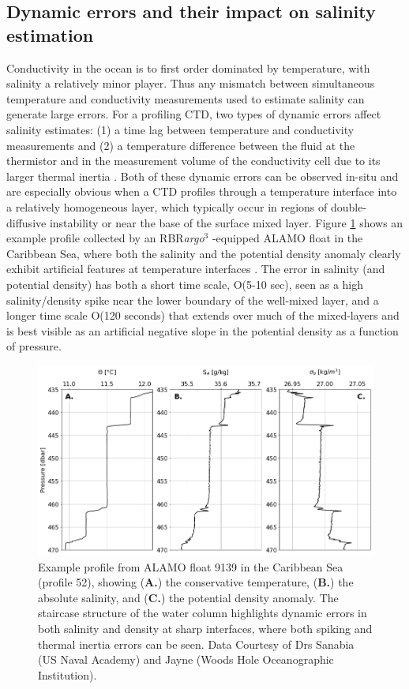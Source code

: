 \documentclass{ametsocV6.1}
\begin{document}
\subsection{Dynamic errors and their impact on salinity estimation}
Conductivity in the ocean is to first order dominated by temperature, with salinity a relatively minor  player. Thus any mismatch between simultaneous temperature and conductivity measurements used to estimate salinity can generate large errors.   
For a profiling CTD, two types of dynamic errors affect salinity estimates: (1) a time lag between temperature and conductivity measurements and (2) a temperature difference between the fluid at the thermistor and in the measurement volume of the conductivity cell due to its larger thermal inertia \citep{Lueck_1990a,Johnson_2007}. 
Both of these dynamic errors can be observed in-situ and are especially obvious when a CTD profiles through a temperature interface into a relatively homogeneous layer, which typically occur in regions of double-diffusive instability or near the base of the surface mixed layer. 
Figure \ref{fig: alamo_example} shows an example profile collected by an RBR\textit{argo}$^3$ -equipped ALAMO float in the Caribbean Sea, where both the salinity and the potential density anomaly clearly exhibit artificial features at temperature interfaces \citep{Jayne_2017, Sanabia_2020}. 
The error in salinity (and potential density) has both a short time scale, O(5-10 sec), seen as a high salinity/density spike near the lower boundary of the well-mixed layer, and a longer time scale O(120 seconds) that extends over much of the mixed-layers and is best visible as an artificial negative slope in the potential density as a function of pressure.

\begin{figure}[t]
	\includegraphics[width = \linewidth]{Fig2_f9139_P52.png}
	\caption{Example profile from ALAMO float 9139 in the Caribbean Sea (profile 52), showing (\textbf{A.}) the conservative temperature, (\textbf{B.}) the absolute salinity, and (\textbf{C.}) the potential density anomaly. The staircase structure of the water column highlights dynamic errors in both salinity and density at sharp interfaces, where both spiking and thermal inertia errors can be seen. Data Courtesy of Drs Sanabia (US Naval Academy) and Jayne (Woods Hole Oceanographic Institution).}
	\label{fig: alamo_example}
\end{figure}
\end{document}
